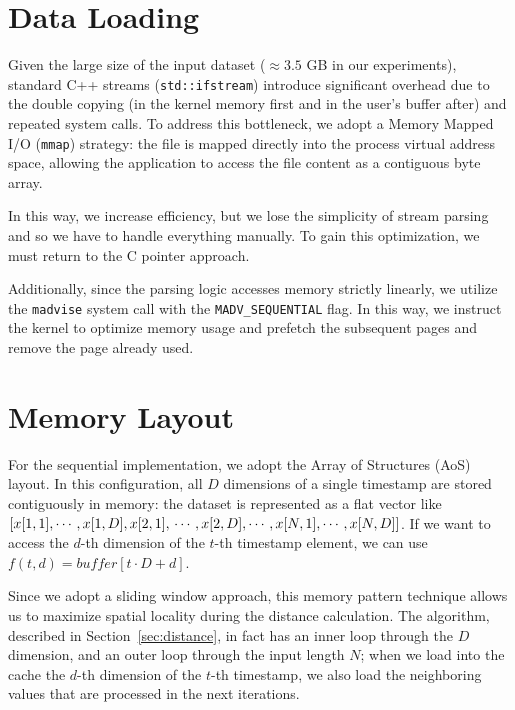 \section{Data Loading}
\label{sec:data_loading}
Given the large size of the input dataset ($\approx 3.5$ GB in our experiments), standard C++ streams (\texttt{std::ifstream}) introduce significant overhead due to the double copying (in the kernel memory first and in the user's buffer after) and repeated system calls. To address this bottleneck, we adopt a Memory Mapped I/O (\texttt{mmap}) strategy: the file is mapped directly into the process virtual address space, allowing the application to access the file content as a contiguous byte array.

In this way, we increase efficiency, but we lose the simplicity of stream parsing and so we have to handle everything manually. To gain this optimization, we must return to the C pointer approach.

Additionally, since the parsing logic accesses memory strictly linearly, we utilize the \texttt{madvise} system call with the \texttt{MADV\_SEQUENTIAL} flag. In this way, we instruct the kernel to optimize memory usage and prefetch the subsequent pages and remove the page already used.

\section{Memory Layout}
\label{sec:seq_memory}
For the sequential implementation, we adopt the Array of Structures (AoS) layout. In this configuration, all $D$ dimensions of a single timestamp are stored contiguously in memory: the dataset is represented as a flat vector like $[x[1,1],\cdots,x[1,D],x[2,1], \\ \cdots,x[2,D],\cdots,x[N,1],\cdots,x[N,D]]$. If we want to access the $d$-th dimension of the $t$-th timestamp element, we can use $f(t,d) = buffer[t \cdot D + d]$.

Since we adopt a sliding window approach, this memory pattern technique allows us to maximize spatial locality during the distance calculation. The algorithm, described in Section~\ref{sec:distance}, in fact has an inner loop through the $D$ dimension, and an outer loop through the input length $N$; when we load into the cache the $d$-th dimension of the $t$-th timestamp, we also load the neighboring values that are processed in the next iterations.

